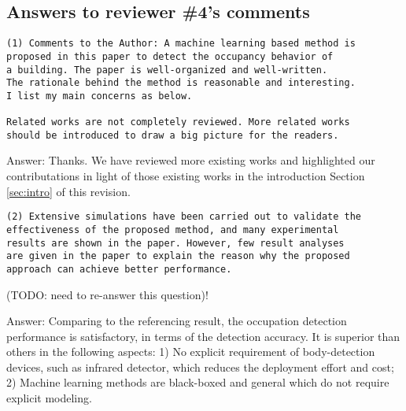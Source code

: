 

\subsection{Answers to reviewer \#4's comments}
\begin{verbatim}
(1) Comments to the Author: A machine learning based method is
proposed in this paper to detect the occupancy behavior of
a building. The paper is well-organized and well-written.
The rationale behind the method is reasonable and interesting.
I list my main concerns as below.

Related works are not completely reviewed. More related works
should be introduced to draw a big picture for the readers.
\end{verbatim}

Answer: Thanks. We have reviewed more existing works and highlighted
our contributations in light of those existing works in the introduction
Section \ref{sec:intro} of this revision.



\begin{verbatim}
(2) Extensive simulations have been carried out to validate the
effectiveness of the proposed method, and many experimental
results are shown in the paper. However, few result analyses
are given in the paper to explain the reason why the proposed
approach can achieve better performance.
\end{verbatim}

(TODO: need to re-answer this question)!

Answer: Comparing to the referencing result, the occupation detection
performance is satisfactory, in terms of the detection accuracy. It is
superior than others in the following aspects: 1) No explicit
requirement of body-detection devices, such as infrared detector,
which reduces the deployment effort and cost; 2) Machine learning
methods are black-boxed and general which do not require explicit
modeling.

